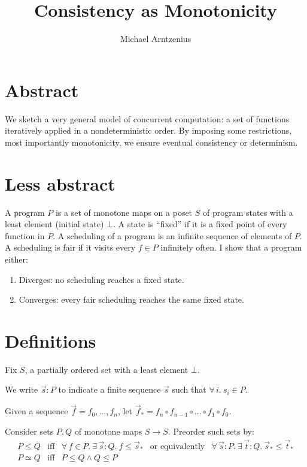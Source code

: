 \documentclass{article}
\newcommand{\fa}[1]{\forall\,{#1}.\ }
\newcommand{\te}[1]{\exists\,{#1}.\ }
\begin{document}
\title{Consistency as Monotonicity}
\author{Michael Arntzenius}
\date{}
\maketitle


\section{Abstract}

We sketch a very general model of concurrent computation: a set of functions
iteratively applied in a nondeterministic order. By imposing some restrictions,
most importantly monotonicity, we ensure eventual consistency or determinism.


\section{Less abstract}

A program $P$ is a set of monotone maps on a poset $S$ of program states with a
least element (initial state) $\bot$. A state is ``fixed'' if it is a fixed
point of every function in $P$. A scheduling of a program is an infinite
sequence of elements of $P$. A scheduling is fair if it visits every $f \in P$
infinitely often. I show that a program either:

\begin{enumerate}
\item Diverges: no scheduling reaches a fixed state.
\item Converges: every fair scheduling reaches the same fixed state.
\end{enumerate}


\section{Definitions}

Fix $S$, a partially ordered set with a least element $\bot$.

We write $\vec{s} : P$ to indicate a finite sequence $\vec{s}$ such that $\fa{i} s_i \in P$.

\newcommand{\seq}[1]{{\vec{#1}_*}}

Given a sequence $\vec{f} = f_0, ..., f_n$, let $\seq{f} = f_n \circ f_{n-1}
\circ ... \circ f_1 \circ f_0$.

Consider sets $P,Q$ of monotone maps $S \to S$. Preorder such sets by:
\[
\begin{array}{ccccc}
P \le Q
&\text{iff}& \fa{f \in P} \te{\vec{s} : Q} f \le \seq{s}
&\text{or equivalently}& \fa{\vec{s} : P} \te{\vec{t} : Q}
{\seq{s} \le \seq{t}}\\
P \simeq Q &\text{iff}& P \le Q \wedge Q \le P
\end{array}
\]
\end{document}
